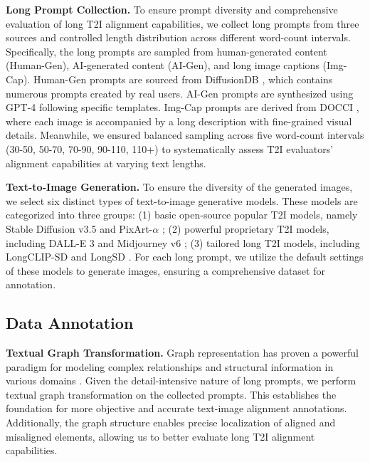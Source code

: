 \documentclass[letterpaper]{article} %
\begin{document}
\textbf{Long Prompt Collection.} To ensure prompt diversity and comprehensive evaluation of long T2I alignment capabilities, we collect long prompts from three sources and controlled length distribution across different word-count intervals. Specifically, the long prompts are sampled from human-generated content (Human-Gen), AI-generated content (AI-Gen), and long image captions (Img-Cap). Human-Gen prompts are sourced from DiffusionDB \cite{wang2023diffusiondb}, which contains numerous prompts created by real users. AI-Gen prompts are synthesized using GPT-4 \cite{achiam2023gpt} following specific templates. Img-Cap prompts are derived from DOCCI \cite{onoe2024docci}, where each image is accompanied by a long description with fine-grained visual details. Meanwhile, we ensured balanced sampling across five word-count intervals (30-50, 50-70, 70-90, 90-110, 110+) to systematically assess T2I evaluators' alignment capabilities at varying text lengths.

\textbf{Text-to-Image Generation.} To ensure the diversity of the generated images, we select six distinct types of text-to-image generative models. These models are categorized into three groups: (1) basic open-source popular T2I models, namely Stable Diffusion v3.5 \cite{esser2024scaling} and PixArt-$\alpha$ \cite{chenpixart}; (2) powerful proprietary T2I models, including DALL-E 3 \cite{dalle} and Midjourney v6 \cite{midjourney}; (3) tailored long T2I models, including LongCLIP-SD \cite{zhang2024long} and LongSD \cite{liu2024improving}. For each long prompt, we utilize the default settings of these models to generate images, ensuring a comprehensive dataset for annotation.

\subsection{Data Annotation}

\textbf{Textual Graph Transformation.} Graph representation has proven a powerful paradigm for modeling complex relationships and structural information in various domains \cite{hamilton2020graph, yang2024semantics}. Given the detail-intensive nature of long prompts, we perform textual graph transformation on the collected prompts. This establishes the foundation for more objective and accurate text-image alignment annotations. Additionally, the graph structure enables precise localization of aligned and misaligned elements, allowing us to better evaluate long T2I alignment capabilities.
\end{document}
